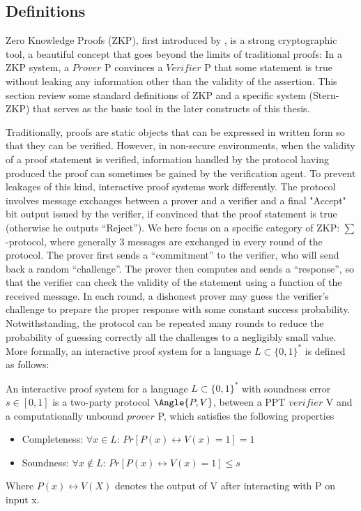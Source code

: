 \subsection{Definitions}
\label{sec:zkpdefinitions}
Zero Knowledge Proofs (ZKP), first introduced by \cite{goldwasser1989knowledge},
is a strong cryptographic tool, a beautiful concept that goes beyond the limits
of traditional proofs: In a ZKP system, a $Prover$ P convinces a $Verifier$ P
that some statement is true without leaking any information other than the validity of the
assertion. This section review some standard definitions of ZKP and a specific
system (Stern-ZKP) that serves as the basic tool in the later constructs of
this thesis.

Traditionally, proofs are static objects that can be expressed in written
form so that they can be verified. However, in non-secure environments, when the
validity of a proof statement is verified, information handled by the protocol having produced the proof can sometimes be gained by the verification agent. To prevent leakages of this kind, interactive proof systems work differently. The protocol involves message exchanges between a prover and a verifier and a final "Accept" bit output issued by the verifier, if convinced that the proof statement is true (otherwise he outputs ``Reject''). We here focus on a specific category of ZKP: \(\sum\)-protocol, where generally 3 messages are exchanged in every round of the protocol. The prover first
sends a ``commitment'' to the verifier, who will send back a random
``challenge''. The prover then computes and sends a ``response'', so that the
verifier can check the validity of the statement using a function of the received
message. In each round, a dishonest prover may guess the verifier's
challenge to prepare the proper response with some constant success
probability. Notwithstanding, the protocol can be repeated many rounds to reduce the
probability of guessing correctly all the challenges to a negligibly small value.  More
formally, an interactive proof system for a language \(L \subset \{0,1\}^{*}\)
is defined as follows:

\begin{definition}
   An interactive proof system for a language
  \(L \subset \{0,1\}^{*}\) with soundness error \(s \in [0,1]\) is a two-party
  protocol \(\Angle{P,V}\), between a PPT \(verifier \) V and a computationally
  unbound \(prover \) P, which satisfies the following properties
  \begin{itemize}
  \item Completeness: \(\forall x \in L\): \(Pr[P(x) \leftrightarrow V(x) = 1] = 1\)
  \item Soundness: \(\forall x \notin L\): \(Pr[P(x) \leftrightarrow V(x) = 1] \leq s\)
  \end{itemize}
\end{definition}
Where \(P(x) \leftrightarrow V(X)\) denotes the output of V after interacting
with P on input x.

